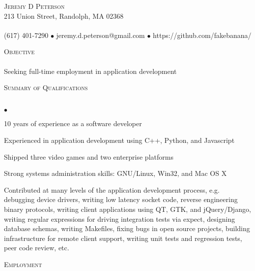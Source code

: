 \documentclass{article}
\newcommand{\lineunder}{\vspace*{-8pt} \\ \hspace*{-18pt} \hrulefill \\}
\newcommand{\header}[1]{{\hspace*{-15pt}\vspace*{6pt} \textsc{#1}} \vspace*{-6pt} \lineunder}
\newcommand{\contact}[3]{
\vspace*{-8pt}
\begin{center}
{\LARGE \scshape {#1}}\\
#2 \lineunder 
#3
\end{center}
\vspace*{-8pt}
}
\newcommand{\objective}[1]{{ #1\vspace*{8pt} }}
\newenvironment{achievements}{\begin{list}{$\bullet$}{\topsep 0pt \itemsep -2pt}}{\vspace*{4pt}\end{list}}
\begin{document}
\small
\smallskip
\vspace*{-44pt}

\contact{Jeremy D Peterson}
{213 Union Street, Randolph, MA 02368}
{(617) 401-7290 $\bullet$ jeremy.d.peterson@gmail.com  $\bullet$ https://github.com/fakebanana/ }

\header{Objective}
\objective {Seeking full-time employment in application development}

\header{Summary of Qualifications}
\begin{achievements}
\item 10 years of experience as a software developer
\item Experienced in application development using C++, Python, and Javascript
\item Shipped three video games and two enterprise platforms
\item Strong systems administration skills: GNU/Linux, Win32, and Mac OS X
\item Contributed at many levels of the application development process, e.g. debugging device drivers, writing low latency socket code, reverse engineering binary protocols, writing client applications using QT, GTK, and jQuery/Django, writing regular expressions for driving integration tests via expect, designing database schemas, writing Makefiles, fixing bugs in open source projects, building infrastructure for remote client support, writing unit tests and regression tests, peer code review, etc.
\end{achievements}

\header{Employment}
\end{document}
